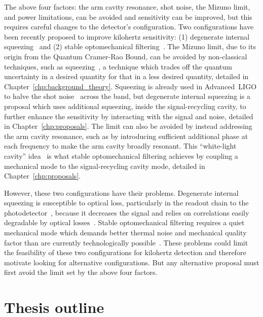 The above four factors: the arm cavity resonance, shot noise, the Mizuno limit, and power limitations, can be avoided and sensitivity can be improved, but this requires careful changes to the detector's configuration. Two configurations have been recently proposed to improve kilohertz sensitivity: (1) degenerate internal squeezing~\cite{Korobko2019,Adya2020} and (2) stable optomechanical filtering~\cite{Li2020,Miao2015}. 
The Mizuno limit, due to its origin from the Quantum Cramer-Rao Bound, can be avoided by non-classical techniques, such as squeezing~\cite{}, a technique which trades off the quantum uncertainty in a desired quantity for that in a less desired quantity, detailed in Chapter~\ref{chp:background_theory}. Squeezing is already used in Advanced~LIGO to halve the shot noise~\cite{tseQuantumEnhancedAdvancedLIGO2019} across the band, but degenerate internal squeezing is a proposal which uses additional squeezing, inside the signal-recycling cavity, to further enhance the sensitivity by interacting with the signal and noise, detailed in Chapter~\ref{chp:proposals}. 
The limit can also be avoided by instead addressing the arm cavity resonance, such as by introducing sufficient additional phase at each frequency to make the arm cavity broadly resonant. This ``white-light cavity'' idea~\cite{Miao2015} is what stable optomechanical filtering achieves by coupling a mechanical mode to the signal-recycling cavity mode, detailed in Chapter~\ref{chp:proposals}.

However, these two configurations have their problems. Degenerate internal squeezing is susceptible to optical loss, particularly in the readout chain to the photodetector~, because it decreases the signal and relies on correlations easily degradable by optical losses~\cite{Korobko2019}. Stable optomechanical filtering requires a quiet mechanical mode which demands better thermal noise and mechanical quality factor than are currently technologically possible~\cite{Li2020,Miao2015}. These problems could limit the feasibility of these two configurations for kilohertz detection and therefore motivate looking for alternative configurations. But any alternative proposal must first avoid the limit set by the above four factors.


\section{Thesis outline}

